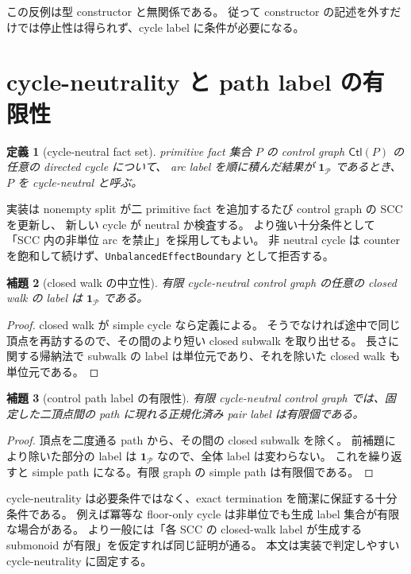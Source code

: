 \documentclass[uplatex,dvipdfmx,a4paper,10.5pt]{jsarticle}
\theoremstyle{jpplain}
\newtheorem{definition}{定義}[section]
\newtheorem{lemma}[definition]{補題}
\newcommand{\Pair}{\mathcal P}
\newcommand{\idp}{\mathbf 1_{\Pair}}
\begin{document}
この反例は型 constructor と無関係である。
従って constructor の記述を外すだけでは停止性は得られず、cycle label に条件が必要になる。

\section{cycle-neutrality と path label の有限性}

\begin{definition}[cycle-neutral fact set]
primitive fact 集合 $P$ の control graph $\mathsf{Ctl}(P)$ の任意の directed cycle について、
arc label を順に積んだ結果が $\idp$ であるとき、$P$ を cycle-neutral と呼ぶ。
\end{definition}

実装は nonempty split が二 primitive fact を追加するたび control graph の SCC を更新し、
新しい cycle が neutral か検査する。
より強い十分条件として「SCC 内の非単位 arc を禁止」を採用してもよい。
非 neutral cycle は counter を飽和して続けず、\texttt{UnbalancedEffectBoundary} として拒否する。

\begin{lemma}[closed walk の中立性]
有限 cycle-neutral control graph の任意の closed walk の label は $\idp$ である。
\end{lemma}

\begin{proof}
closed walk が simple cycle なら定義による。
そうでなければ途中で同じ頂点を再訪するので、その間のより短い closed subwalk を取り出せる。
長さに関する帰納法で subwalk の label は単位元であり、それを除いた closed walk も単位元である。
\end{proof}

\begin{lemma}[control path label の有限性]
\label{lem:path-finite}
有限 cycle-neutral control graph では、固定した二頂点間の path に現れる正規化済み pair label は有限個である。
\end{lemma}

\begin{proof}
頂点を二度通る path から、その間の closed subwalk を除く。
前補題により除いた部分の label は $\idp$ なので、全体 label は変わらない。
これを繰り返すと simple path になる。有限 graph の simple path は有限個である。
\end{proof}

\begin{notebox}
cycle-neutrality は必要条件ではなく、exact termination を簡潔に保証する十分条件である。
例えば冪等な floor-only cycle は非単位でも生成 label 集合が有限な場合がある。
より一般には「各 SCC の closed-walk label が生成する submonoid が有限」を仮定すれば同じ証明が通る。
本文は実装で判定しやすい cycle-neutrality に固定する。
\end{notebox}
\end{document}
